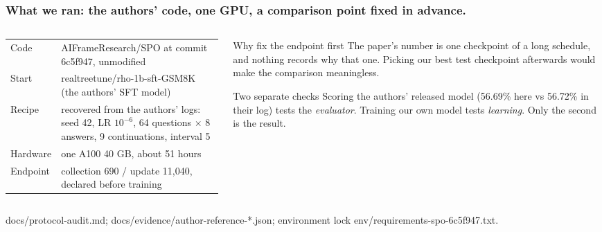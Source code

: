 \documentclass[aspectratio=169,11pt]{beamer}
\newcommand{\source}[1]{\vfill{\scriptsize\color{Gray}#1\par}}
\begin{document}
\begin{frame}[t]
\frametitle{What we ran: the authors' code, one GPU, a comparison point fixed in advance.}
\small
\begin{columns}[T,onlytextwidth]
\begin{column}{.50\textwidth}
\begin{tabular}{@{}>{\raggedright\arraybackslash}p{.2\linewidth}>{\raggedright\arraybackslash}p{.76\linewidth}@{}}
\toprule
Code & AIFrameResearch/SPO at commit 6c5f947, unmodified\\
Start & realtreetune/rho-1b-sft-GSM8K (the authors' SFT model)\\
Recipe & recovered from the authors' logs: seed 42, LR $10^{-6}$, 64 questions $\times$ 8 answers, 9 continuations, interval 5\\
Hardware & one A100 40 GB, about 51 hours\\
Endpoint & collection 690 / update 11,040, declared before training\\
\bottomrule
\end{tabular}
\end{column}
\begin{column}{.46\textwidth}
\begin{block}{Why fix the endpoint first}
The paper's number is one checkpoint of a long schedule, and nothing records why that one.
Picking our best test checkpoint afterwards would make the comparison meaningless.
\end{block}
\begin{block}{Two separate checks}
Scoring the authors' released model (56.69\% here vs 56.72\% in their log) tests the
\emph{evaluator}. Training our own model tests \emph{learning}. Only the second is the result.
\end{block}
\end{column}
\end{columns}
\source{docs/protocol-audit.md; docs/evidence/author-reference-*.json; environment lock env/requirements-spo-6c5f947.txt.}
\end{frame}
\end{document}
